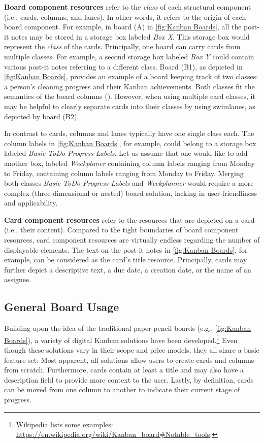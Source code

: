 \textbf{Board component resources} refer to the \textit{class} of each structural component (i.e., cards, columns, and lanes). In other words, it refers to the origin of each board component. For example, in board (A) in \autoref{fig:Kanban Boards}, all the post-it notes may be stored in a storage box labeled \textit{Box X}. This storage box would represent the \textit{class} of the cards. Principally, one board can carry cards from multiple classes. For example, a second storage box labeled \textit{Box Y} could contain various post-it notes referring to a different class. Board (B1), as depicted in \autoref{fig:Kanban Boards}, provides an example of a board keeping track of two classes: a person’s cleaning progress and their Kanban achievements. Both classes fit the semantics of the board columns (\kern1pt\kern1pt). However, when using multiple card classes, it may be helpful to clearly separate cards into their classes by using swimlanes, as depicted by board (B2).

In contrast to cards, columns and lanes typically have one single class each. The column labels in \autoref{fig:Kanban Boards}, for example, could belong to a storage box labeled \textit{Basic ToDo Progress Labels}. Let us assume that one would like to add another box, labeled \textit{Weekplaner} containing column labels ranging from Monday to Friday, containing column labels ranging from Monday to Friday. Merging both classes \textit{Basic ToDo Progress Labels} and \textit{Weekplanner} would require a more complex (three-dimensional or nested) board solution, lacking in user-friendliness and applicability. 

\textbf{Card component resources} refer to the resources that are depicted on a card (i.e., their content). Compared to the tight boundaries of board component resources, card component resources are virtually endless regarding the number of displayable elements. The text on the post-it notes in \autoref{fig:Kanban Boards}, for example, can be considered as the card’s title resource. Principally, cards may further depict a descriptive text, a due date, a creation date, or the name of an assignee.


\subsection{General Board Usage}

Building upon the idea of the traditional paper-pencil boards (e.g., \autoref{fig:Kanban Boards}), a variety of digital Kanban solutions have been developed.\footnote{Wikipedia lists some examples: \url{https://en.wikipedia.org/wiki/Kanban_board\#Notable_tools}.} Even though these solutions vary in their scope and price models, they all share a basic feature set: Most apparent, all solutions allow users to create cards and columns from scratch. Furthermore, cards contain at least a title and may also have a description field to provide more context to the user. Lastly, by definition, cards can be moved from one column to another to indicate their current stage of progress.

